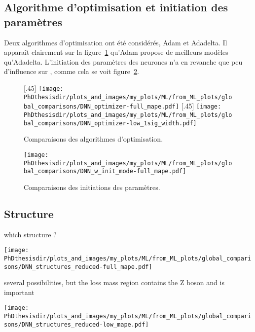\subsection{Algorithme d'optimisation et initiation des paramètres}
Deux algorithmes d'optimisation ont été considérés, Adam et Adadelta.
Il apparaît clairement sur la figure~\ref{fig-optimizer} qu'Adam propose de meilleurs modèles qu'Adadelta.
L'initiation des paramètres des neurones n'a en revanche que peu d'influence sur \LossMAPE, comme cela se voit figure~\ref{fig-w_init_mode}.
\begin{figure}[h]
\centering

\subcaptionbox{}[.45\textwidth]
{\texttt{[image: \\PhDthesisdir/plots\_and\_images/my\_plots/ML/from\_ML\_plots/global\_comparisons/DNN\_optimizer-full\_mape.pdf]}\vspace{-\baselineskip}}
\hfill
\subcaptionbox{}[.45\textwidth]
{\texttt{[image: \\PhDthesisdir/plots\_and\_images/my\_plots/ML/from\_ML\_plots/global\_comparisons/DNN\_optimizer-low\_1sig\_width.pdf]}\vspace{-\baselineskip}}
\caption{Comparaisons des algorithmes d'optimisation.}
\label{fig-optimizer}
\end{figure}
\begin{figure}[h]
\centering
\texttt{[image: \\PhDthesisdir/plots\_and\_images/my\_plots/ML/from\_ML\_plots/global\_comparisons/DNN\_w\_init\_mode-full\_mape.pdf]}
\caption{Comparaisons des initiations des paramètres.}
\label{fig-w_init_mode}
\end{figure}
\subsection{Structure}
which structure ?

\texttt{[image: \\PhDthesisdir/plots\_and\_images/my\_plots/ML/from\_ML\_plots/global\_comparisons/DNN\_structures\_reduced-full\_mape.pdf]}

several possibilities, but the loss mass region contains the Z boson and is important

\texttt{[image: \\PhDthesisdir/plots\_and\_images/my\_plots/ML/from\_ML\_plots/global\_comparisons/DNN\_structures\_reduced-low\_mape.pdf]}

